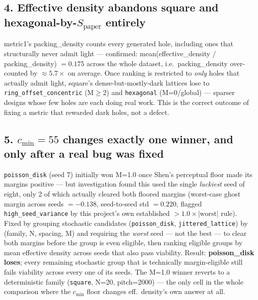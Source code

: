 \documentclass[10pt]{article}
\begin{document}
\subsection*{4. Effective density abandons square and hexagonal-by-\texorpdfstring{$S_\text{paper}$}{S\_paper} entirely}
metric1's packing\_density counts every generated hole, including ones that structurally never
admit light — confirmed: mean(effective\_density / packing\_density) $=0.175$ across the whole
dataset, i.e.\ packing\_density over-counted by $\approx5.7\times$ on average. Once ranking is
restricted to \emph{only} holes that actually admit light, square's dense-but-mostly-dark lattices
lose to \texttt{ring\_offset\_concentric} (M$\geq$2) and \texttt{hexagonal} (M=0/global) —
sparser designs whose few holes are each doing real work. This is the correct outcome of fixing a
metric that rewarded dark holes, not a defect.

\subsection*{5. \texorpdfstring{$c_\text{min}=55$}{c\_min=55} changes exactly one winner, and only after a real bug was fixed}
\texttt{poisson\_disk} (seed 7) initially won M=1.0 once Shen's perceptual floor made its margins
positive — but investigation found this used the single \emph{luckiest} seed of eight, only 2 of
which actually cleared both floored margins (worst-case ghost margin across seeds $=-0.138$,
seed-to-seed std $=0.220$, flagged \texttt{high\_seed\_variance} by this project's own established
$>1.0\times|\text{worst}|$ rule). Fixed by grouping stochastic candidates
(\texttt{poisson\_disk}, \texttt{jittered\_lattice}) by (family, N, spacing, M) and requiring the
\emph{worst} seed — not the best — to clear both margins before the group is even eligible, then
ranking eligible groups by mean effective density across seeds that also pass viability. Result:
\textbf{poisson\_disk loses}; every remaining stochastic group that is technically margin-eligible
still fails viability across every one of its seeds. The M=1.0 winner reverts to a deterministic
family (\texttt{square}, N=20, pitch=2000) — the only cell in the whole comparison where the
$c_\text{min}$ floor changes eff.\ density's own answer at all.
\end{document}
